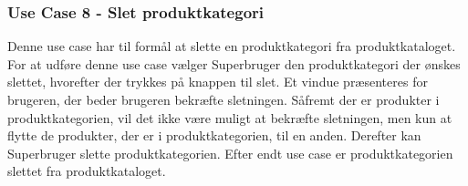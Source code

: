 \subsubsection{Use Case 8 - Slet produktkategori}
Denne use case har til formål at slette en produktkategori fra produktkataloget. For at udføre denne use case vælger Superbruger den produktkategori der ønskes slettet, hvorefter der trykkes på knappen til slet. Et vindue præsenteres for brugeren, der beder brugeren bekræfte sletningen. Såfremt der er produkter i produktkategorien, vil det ikke være muligt at bekræfte sletningen, men kun at flytte de produkter, der er i produktkategorien, til en anden. Derefter kan Superbruger slette produktkategorien. Efter endt use case er produktkategorien slettet fra produktkataloget.